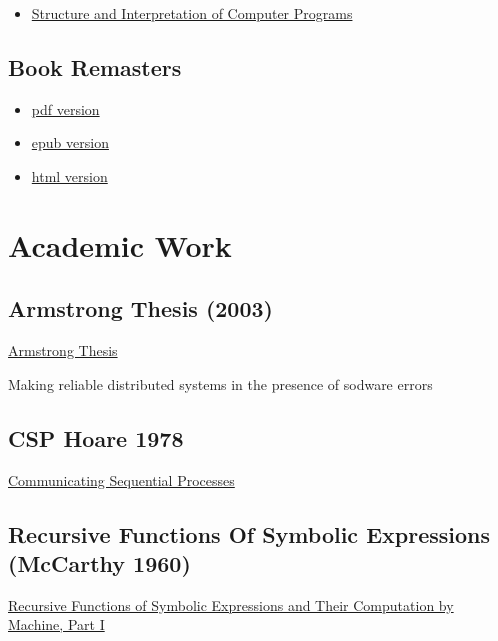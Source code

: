 \documentclass[11pt]{article}
\begin{document}
\begin{itemize}
\item \href{https://ocw.mit.edu/courses/electrical-engineering-and-computer-science/6-001-structure-and-interpretation-of-computer-programs-spring-2005/}{Structure and Interpretation of Computer Programs}
\end{itemize}

\subsection{Book Remasters}
\label{sec:orgcb10a07}

\begin{itemize}
\item \href{https://github.com/sarabander/sicp-pdf/raw/master/sicp.pdf}{pdf version}
\item \href{https://github.com/sarabander/sicp-epub/blob/master/sicp.epub?raw=true}{epub version}
\item \href{https://sarabander.github.io/sicp/}{html version}
\end{itemize}

\section{Academic Work}
\label{sec:org0959a99}

\subsection{Armstrong Thesis (2003)}
\label{sec:orgec82abf}

\href{http://erlang.org/download/armstrong\_thesis\_2003.pdf}{Armstrong Thesis}

Making reliable distributed systems in the presence of sodware errors

\subsection{CSP Hoare 1978}
\label{sec:orgc905643}

\href{https://spinroot.com/courses/summer/Papers/hoare\_1978.pdf}{Communicating Sequential Processes}

\subsection{Recursive Functions Of Symbolic Expressions (McCarthy 1960)}
\label{sec:orgd1eac9e}

\href{http://www-formal.stanford.edu/jmc/recursive.pdf}{Recursive Functions of Symbolic Expressions and Their Computation by Machine, Part I}
\end{document}
